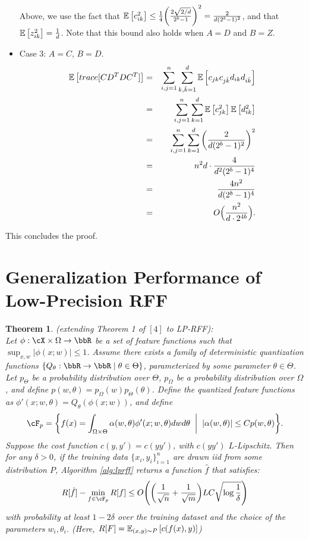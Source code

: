 \documentclass[12pt]{article}
\newcommand{\hk}{\hat{k}}
\newtheorem{theorem}{Theorem}[section]
\begin{document}
\begin{itemize}
\begin{eqnarray*}
	\end{eqnarray*}
	Above, we use the fact that $\expect{}{c_{ik}^2} \leq \frac{1}{4}\bigg(\frac{2\sqrt{2/d}}{2^b-1}\bigg)^2 = \frac{2}{d(2^b-1)^2}$, and that $\expect{}{z_{ik}^2} = \frac{1}{d}$.  Note that this bound also holds when $A=D$ and $B=Z$.
	\item Case 3: $A=C$, $B=D$.
	\begin{eqnarray*}
		\expect{}{trace[CD^TDC^T]} &=& \sum_{i,j=1}^n \sum_{k,\hk=1}^d \expect{}{c_{jk}c_{j\hk}d_{ik}d_{i\hk}}\\
		&=& \sum_{i,j=1}^n \sum_{k=1}^d \expect{}{c_{jk}^2}\expect{}{d_{ik}^2}\\
		&=& \sum_{i,j=1}^n \sum_{k=1}^d \bigg(\frac{2}{d(2^b-1)^2}\bigg)^2\\
		&=& n^2d \cdot\frac{4}{d^2(2^b-1)^4}\\
		&=& \frac{4n^2}{d(2^b-1)^4}\\
		&=& O\Big(\frac{n^2}{d \cdot 2^{4b}}\Big).
	\end{eqnarray*}
\end{itemize}
This concludes the proof.

\section{Generalization Performance of Low-Precision RFF}
\label{sec:gen}

\begin{theorem} (extending Theorem 1 of $[4]$ to LP-RFF): \\
\label{thm:gen}
Let $\phi:\cX\times\Omega\rightarrow\RR$ be a set of feature functions such that $\sup_{x,w}|\phi(x;w)| \leq 1$. Assume there exists a family of deterministic quantization functions $\{Q_{\theta}:\RR\rightarrow\RR \;|\; \theta\in\Theta \}$, parameterized by some parameter $\theta\in\Theta$.  Let $p_{\Theta}$ be a probability distribution over $\Theta$, $p_{\Omega}$ be a probability distribution over $\Omega$, and define $p(w,\theta) = p_{\Omega}(w)p_{\Theta}(\theta)$.
Define the quantized feature functions as $\phi'(x;w,\theta) = Q_{\theta}(\phi(x;w))$, and define
$$\cF_p = \bigg\{f(x) = \int_{\Omega\times\Theta} \alpha(w,\theta) \phi'(x;w,\theta)dwd\theta \;\;\bigg|\;\; |\alpha(w,\theta)| \leq Cp(w,\theta)\bigg\}.$$
Suppose the cost function $c(y,y') = c(yy')$, with $c(yy')$ $L$-Lipschitz.  Then for any $\delta > 0$, if the training data $\{x_i,y_i\}_{i=1}^n$ are drawn iid from some distribution $P$, Algorithm \ref{alg:lprff}  returns a function $\hat{f}$ that satisfies:
$$R[\hat{f}] - \min_{f\in\cF_p}R[f] \leq O\Bigg(\bigg(\frac{1}{\sqrt{n}} + \frac{1}{\sqrt{m}}\bigg)LC \sqrt{\log\frac{1}{\delta}}\Bigg)$$
with probability at least $1-2\delta$ over the training dataset and the choice of the parameters $w_i,\theta_i$.
(Here, $R[F] = \expect{(x,y)\sim P}{c(f(x),y)}$)
\end{theorem}
\end{document}
